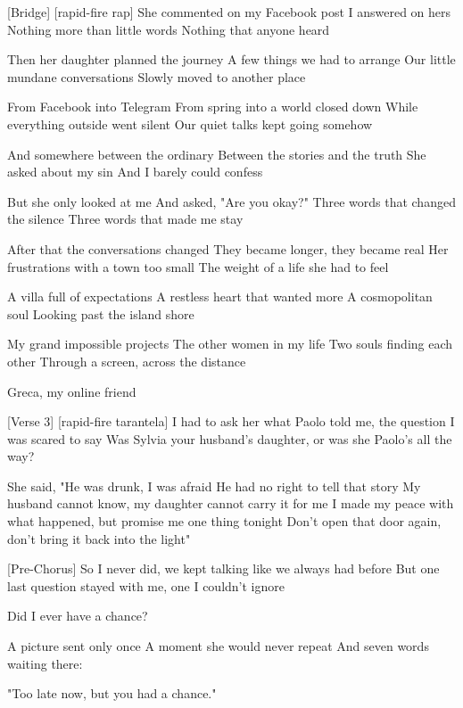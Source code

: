 [Bridge]
[rapid-fire rap]
She commented on my Facebook post
I answered on hers
Nothing more than little words
Nothing that anyone heard

Then her daughter planned the journey
A few things we had to arrange
Our little mundane conversations
Slowly moved to another place

From Facebook into Telegram
From spring into a world closed down
While everything outside went silent
Our quiet talks kept going somehow

And somewhere between the ordinary
Between the stories and the truth
She asked about my sin
And I barely could confess

But she only looked at me
And asked, "Are you okay?"
Three words that changed the silence
Three words that made me stay

After that the conversations changed
They became longer, they became real
Her frustrations with a town too small
The weight of a life she had to feel

A villa full of expectations
A restless heart that wanted more
A cosmopolitan soul
Looking past the island shore

My grand impossible projects
The other women in my life
Two souls finding each other
Through a screen, across the distance

Greca, my online friend

[Verse 3]
[rapid-fire tarantela]
I had to ask her what Paolo told me, the question I was scared to say
Was Sylvia your husband's daughter, or was she Paolo's all the way?

She said, "He was drunk, I was afraid
He had no right to tell that story
My husband cannot know, my daughter cannot carry it for me
I made my peace with what happened, but promise me one thing tonight
Don't open that door again, don't bring it back into the light"

[Pre-Chorus]
So I never did, we kept talking like we always had before
But one last question stayed with me, one I couldn't ignore

Did I ever have a chance?

A picture sent only once
A moment she would never repeat
And seven words waiting there:

"Too late now, but you had a chance."
